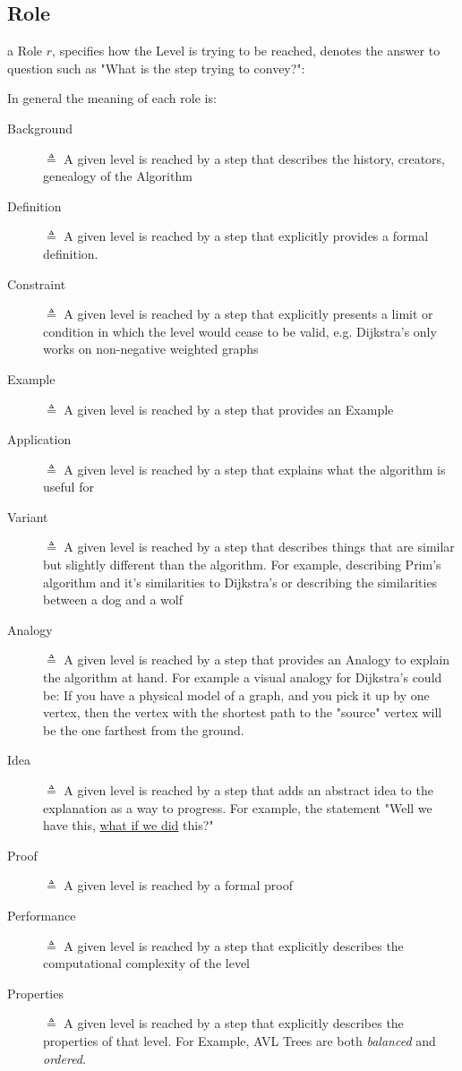 \documentclass[10pt, letterpaper]{article}
\begin{document}
\subsection*{Role}
\label{sec:orgbce9be6}
a Role \(r\), specifies how the Level is trying to be reached, denotes the
answer to question such as "What is the step trying to convey?":

In general the meaning of each role is:
\begin{description}
\item[{Background}] \(\triangleq\) A given level is reached by a step that describes the history,
creators, genealogy of the Algorithm
\item[{Definition}] \(\triangleq\) A given level is reached by a step that explicitly provides a
formal definition.
\item[{Constraint}] \(\triangleq\) A given level is reached by a step that explicitly presents a
limit or condition in which the level would cease to be valid, e.g.
Dijkstra's only works on non-negative weighted graphs
\item[{Example}] \(\triangleq\) A given level is reached by a step that provides an Example
\item[{Application}] \(\triangleq\) A given level is reached by a step that explains what the
algorithm is useful for
\item[{Variant}] \(\triangleq\) A given level is reached by a step that describes things that are
similar but slightly different than the algorithm. For example, describing
Prim's algorithm and it's similarities to Dijkstra's or describing the
similarities between a dog and a wolf
\item[{Analogy}] \(\triangleq\) A given level is reached by a step that provides an Analogy to
explain the algorithm at hand. For example a visual analogy for Dijkstra's
could be: If you have a physical model of a graph, and you pick it up by
one vertex, then the vertex with the shortest path to the "source" vertex
will be the one farthest from the ground.
\item[{Idea}] \(\triangleq\) A given level is reached by a step that adds an abstract idea to the
explanation as a way to progress. For example, the statement "Well we have
this, \uline{what if we did} this?"
\item[{Proof}] \(\triangleq\) A given level is reached by a formal proof
\item[{Performance}] \(\triangleq\) A given level is reached by a step that explicitly describes
the computational complexity of the level
\item[{Properties}] \(\triangleq\) A given level is reached by a step that explicitly describes the properties of that level. For Example, AVL Trees are both \emph{balanced} and \emph{ordered}.
\end{description}
\end{document}

